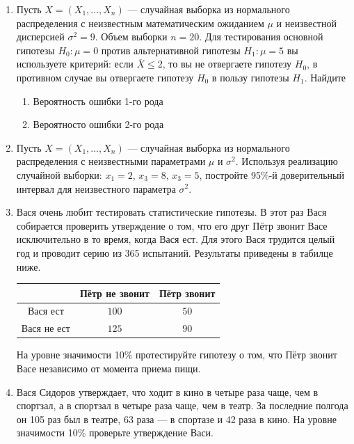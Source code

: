 \begin{enumerate}


	\item Пусть $X=(X_{1}, \ldots,X_{n})$ — случайная выборка из нормального распределения с неизвестным математическим ожиданием $\mu$ и неизвестной дисперсией $\sigma^2=9$. Объем выборки $n=20$. Для тестирования основной гипотезы $H_{0}:\mu=0$ против альтернативной гипотезы $H_{1}:\mu=5$ вы используете критерий: если $\overline{X}\leq2$, то вы не отвергаете гипотезу $H_{0}$, в противном случае вы отвергаете гипотезу $H_{0}$ в пользу гипотезы $H_{1}$. Найдите
	\begin{enumerate}
	\item Вероятность ошибки 1-го рода
	\item Вероятносто ошибки 2-го рода
	\end{enumerate}


		\item Пусть $X=(X_{1}, \ldots,X_{n})$ — случайная выборка из нормального распределения с неизвестными параметрами $\mu$ и $\sigma^2$. Используя реализацию случайной выборки: $x_{1}=2$, $x_{3}=8$, $x_{3}=5$, постройте 95\%-й доверительный интервал для неизвестного параметра $\sigma^2$.


	\item Вася очень любит тестировать статистические гипотезы. В этот раз Вася собирается проверить утверждение о том, что его друг Пётр звонит Васе исключительно в то время, когда Вася ест. Для этого Вася трудится целый год и проводит серию из 365 испытаний. Результаты приведены в табилце ниже.

	\begin{center}
		\begin{tabular}{c|cc}
			\toprule
			& Пётр не звонит & Пётр звонит\\
			\midrule
			Вася ест & $100$ & $50$\\
			Вася не ест  & $125$ & $90$\\
			\bottomrule
		\end{tabular}
	\end{center}

	На уровне значимости 10\% протестируйте гипотезу о том, что Пётр звонит Васе независимо от момента приема пищи.


\item Вася Сидоров утверждает, что ходит в кино в четыре раза чаще, чем в спортзал, а в спортзал в четыре раза чаще, чем в театр.
За последние полгода он 105 раз был в театре, 63 раза — в спортазе и 42 раза в кино.
На уровне значимости 10\% проверьте утверждение Васи.

\end{enumerate}


